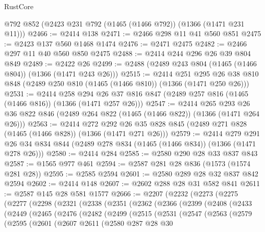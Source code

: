 \begin{lexlean}{RustCore}
\begin{coremodule}
    @792
    @852
    (@2423 @231 @792 (@1465 (@1466 @792)) (@1366 (@1471 @231 @11)))
@2466 := @2414 @138
@2471 := @2466 @298 @11 @41 @560 @851
@2475 := @2423 @137 @560 @1468 @1474
@2476 := @2471 @2475
@2482 := @2466 @297 @11 @40 @560 @850 @2475
@2488 := @2414 @244 @296 @26 @39 @804 @849
@2489 := @2422 @26
@2499 := @2488 (@2489 @243 @804 (@1465 (@1466 @804)) (@1366 (@1471 @243 @26)))
@2515 := @2414
    @251
    @295
    @26
    @38
    @810
    @848
    (@2489 @250 @810 (@1465 (@1466 @810)) (@1366 (@1471 @250 @26)))
@2531 := @2414
    @258
    @294
    @26
    @37
    @816
    @847
    (@2489 @257 @816 (@1465 (@1466 @816)) (@1366 (@1471 @257 @26)))
@2547 := @2414
    @265
    @293
    @26
    @36
    @822
    @846
    (@2489 @264 @822 (@1465 (@1466 @822)) (@1366 (@1471 @264 @26)))
@2563 := @2414
    @272
    @292
    @26
    @35
    @828
    @845
    (@2489 @271 @828 (@1465 (@1466 @828)) (@1366 (@1471 @271 @26)))
@2579 := @2414
    @279
    @291
    @26
    @34
    @834
    @844
    (@2489 @278 @834 (@1465 (@1466 @834)) (@1366 (@1471 @278 @26)))
@2580 := @2414 @284
@2585 := @2580 @290 @28 @33 @837 @843
@2587 := @1565 @977 @461
@2594 := @2587 @281 @28 @836 (@1573 (@1574 @281 @28))
@2595 := @2585 @2594
@2601 := @2580 @289 @28 @32 @837 @842 @2594
@2602 := @2414 @148
@2607 := @2602 @288 @28 @31 @582 @841
@2611 := @2587 @145 @28 @581 @1577
@2666 := @2207
    (@2232
      (@2273
        (@2275
          (@2277
            (@2298
              (@2321
                (@2338
                  (@2351
                    (@2362
                      (@2366
                        (@2399
                          (@2408
                            (@2433
                              (@2449
                                (@2465
                                  (@2476
                                    (@2482
                                      (@2499
                                        (@2515
                                          (@2531
                                            (@2547
                                              (@2563
                                                (@2579
                                                  (@2595
                                                    (@2601
                                                      (@2607
                                                        @2611
                                                        (@2580
                                                          @287
                                                          @28
                                                          @30

\end{coremodule}
\end{lexlean}
